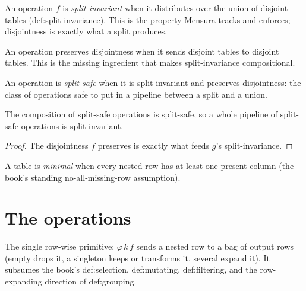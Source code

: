 \begin{definition}
  \label{def:split-invariant}\leanok
  An operation $f$ is \emph{split-invariant} when it distributes over
  the union of disjoint tables (def:split-invariance).  This is the
  property Mensura tracks and enforces; disjointness is exactly what a
  split produces.
\end{definition}

\begin{definition}
  \label{def:preserves-disjoint}\leanok
  An operation preserves disjointness when it sends disjoint tables to
  disjoint tables.  This is the missing ingredient that makes
  split-invariance compositional.
\end{definition}

\begin{definition}
  \label{def:splitsafe}\leanok
  An operation is \emph{split-safe} when it is split-invariant and
  preserves disjointness: the class of operations safe to put in a
  pipeline between a split and a union.
\end{definition}

\begin{theorem}
  \label{thm:splitsafe-comp}\leanok
  The composition of split-safe operations is split-safe, so a whole
  pipeline of split-safe operations is split-invariant.
\end{theorem}
\begin{proof}\leanok
  The disjointness $f$ preserves is exactly what feeds $g$'s
  split-invariance.
\end{proof}

\begin{definition}[Minimality]
  \label{def:minimal}\leanok
  A table is \emph{minimal} when every nested row has at least one
  present column (the book's standing no-all-missing-row assumption).
\end{definition}

\chapter{The operations}

\begin{definition}
  \label{def:flatMap}\leanok
  The single row-wise primitive: $\varphi\,k\,f$ sends a nested row to a
  bag of output rows (empty drops it, a singleton keeps or transforms
  it, several expand it).  It subsumes the book's def:selection,
  def:mutating, def:filtering, and the row-expanding direction of
  def:grouping.
\end{definition}

